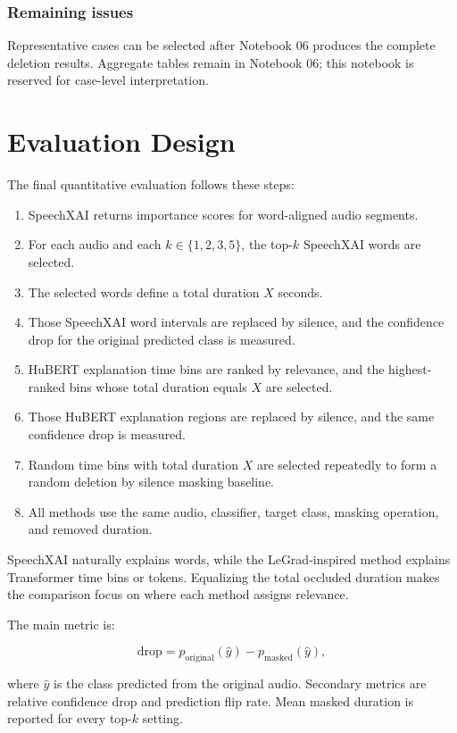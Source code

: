 \documentclass[11pt]{article}
\begin{document}
\subsubsection*{Remaining issues}
Representative cases can be selected after Notebook 06 produces the complete
deletion results. Aggregate tables remain in Notebook 06; this notebook is
reserved for case-level interpretation.

\section{Evaluation Design}

The final quantitative evaluation follows these steps:

\begin{enumerate}
  \item SpeechXAI returns importance scores for word-aligned audio segments.
  \item For each audio and each $k \in \{1,2,3,5\}$, the top-$k$ SpeechXAI words are selected.
  \item The selected words define a total duration $X$ seconds.
  \item Those SpeechXAI word intervals are replaced by silence, and the confidence drop for the original predicted class is measured.
  \item HuBERT explanation time bins are ranked by relevance, and the highest-ranked bins whose total duration equals $X$ are selected.
  \item Those HuBERT explanation regions are replaced by silence, and the same confidence drop is measured.
  \item Random time bins with total duration $X$ are selected repeatedly to form a random deletion by silence masking baseline.
  \item All methods use the same audio, classifier, target class, masking operation, and removed duration.
\end{enumerate}

SpeechXAI naturally explains words, while the LeGrad-inspired method explains Transformer time bins or tokens. Equalizing the total occluded duration makes the comparison focus on where each method assigns relevance.

The main metric is:

\[
\mathrm{drop}
= p_{\mathrm{original}}(\hat{y})
- p_{\mathrm{masked}}(\hat{y}),
\]

where $\hat{y}$ is the class predicted from the original audio. Secondary metrics are relative confidence drop and prediction flip rate. Mean masked duration is reported for every top-$k$ setting.
\end{document}
